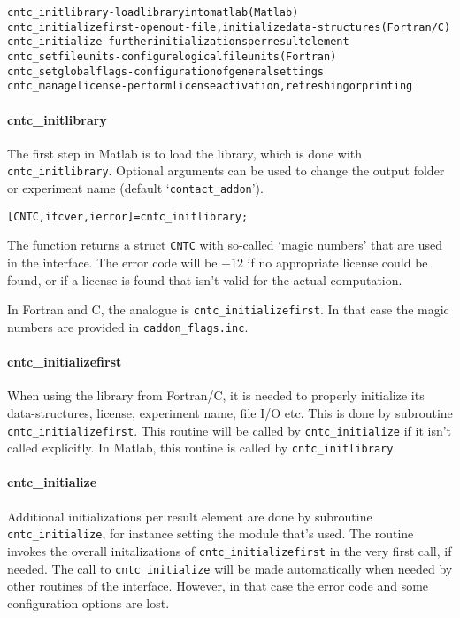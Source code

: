 \documentclass[12pt]{report}
\begin{document}
\begin{alltt}\small
cntc_initlibrary          - load library into matlab (Matlab)
cntc_initializefirst      - open out-file, initialize data-structures (Fortran/C)
cntc_initialize           - further initializations per result element
cntc_setfileunits         - configure logical file units (Fortran)
cntc_setglobalflags       - configuration of general settings
cntc_managelicense        - perform license activation, refreshing or printing
\end{alltt}

\paragraph{cntc\_initlibrary}

The first step in Matlab is to load the library, which is done with {\tt
cntc\_\-init\-library}. Optional arguments can be used to change the
output folder or experiment name (default `{\tt contact\_addon}').
\begin{alltt}\small
   [CNTC, ifcver, ierror] = cntc_initlibrary;
\end{alltt}
The function returns a struct {\tt CNTC} with so-called `magic numbers'
that are used in the interface. The error code will be $-12$ if no
appropriate license could be found, or if a license is found that isn't
valid for the actual computation.

In Fortran and C, the analogue is {\tt cntc\_initializefirst}. In that
case the magic numbers are provided in {\tt caddon\_\-flags.\-inc}.

\paragraph{cntc\_initializefirst}

When using the library from Fortran/C, it is needed to properly
initialize its data-structures, license, experiment name, file I/O etc.
This is done by subroutine {\tt cntc\_init\-ia\-lize\-first}. This
routine will be called by {\tt cntc\_initialize} if it isn't called
explicitly. In Matlab, this routine is called by {\tt cntc\_initlibrary}. 

\paragraph{cntc\_initialize}

Additional initializations per result element are done by subroutine {\tt
cntc\_\-init\-ial\-ize}, for instance setting the module that's used. The
routine invokes the overall initalizations of {\tt cntc\_initializefirst}
in the very first call, if needed. The call to {\tt cntc\_initialize} will
be made automatically when needed by other routines of the interface.
However, in that case the error code and some configuration options are
lost.
\end{document}
